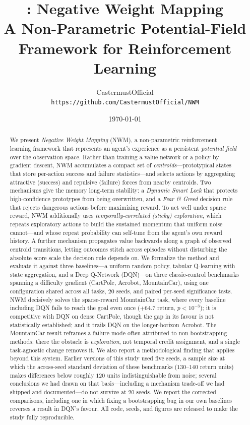 \documentclass[11pt]{article}
\title{\NWM: Negative Weight Mapping\\
\large A Non-Parametric Potential-Field Framework for Reinforcement Learning}
\author{CastermustOfficial\\
\texttt{https://github.com/CastermustOfficial/NWM}}
\date{\today}
\newcommand{\NWM}{\textsc{NWM}}
\begin{document}
\maketitle

\begin{abstract}
We present \emph{Negative Weight Mapping} (\NWM), a non-parametric reinforcement
learning framework that represents an agent's experience as a persistent
\emph{potential field} over the observation space. Rather than training a value
network or a policy by gradient descent, \NWM{} accumulates a compact set of
\emph{centroids}---prototypical states that store per-action success and failure
statistics---and selects actions by aggregating attractive (success) and
repulsive (failure) forces from nearby centroids. Two mechanisms give the memory
long-term stability: a \emph{Dynamic Smart Lock} that protects high-confidence
prototypes from being overwritten, and a \emph{Fear \& Greed} decision rule that
rejects dangerous actions before maximizing reward. To act well under sparse
reward, \NWM{} additionally uses \emph{temporally-correlated (sticky)
exploration}, which repeats exploratory actions to build the sustained momentum
that uniform noise cannot---and whose repeat probability can self-tune from the
agent's own reward history. A further mechanism propagates value backwards along
a graph of observed centroid transitions, letting outcomes stitch across
episodes without disturbing the absolute score scale the decision rule depends
on. We formalize the method and evaluate it against three baselines---a uniform
random policy, tabular Q-learning with state aggregation, and a Deep Q-Network
(DQN)---on three classic-control benchmarks spanning a difficulty gradient
(CartPole, Acrobot, MountainCar), using one configuration shared across all
tasks, $20$ seeds, and paired per-seed significance tests. \NWM{} decisively
solves the sparse-reward MountainCar task, where every baseline including DQN
fails to reach the goal even once ($+64.7$ return, $p<10^{-3}$); it is
competitive with DQN on dense CartPole, though the gap in its favour is not
statistically established; and it trails DQN on the longer-horizon Acrobot. The
MountainCar result reframes a failure mode often attributed to non-bootstrapping
methods: there the obstacle is \emph{exploration}, not temporal credit
assignment, and a single task-agnostic change removes it. We also report a
methodological finding that applies beyond this system. Earlier versions of this
study used five seeds, a sample size at which the across-seed standard deviation
of these benchmarks ($130$--$140$ return units) makes differences below roughly
$120$ units indistinguishable from noise; several conclusions we had drawn on
that basis---including a mechanism trade-off we had shipped and documented---do
not survive at $20$ seeds. We report the corrected comparisons, including one in
which fixing a bootstrapping bug in our own baselines reverses a result in
DQN's favour. All code, seeds, and figures are released to make the study fully
reproducible.
\end{abstract}
\end{document}
